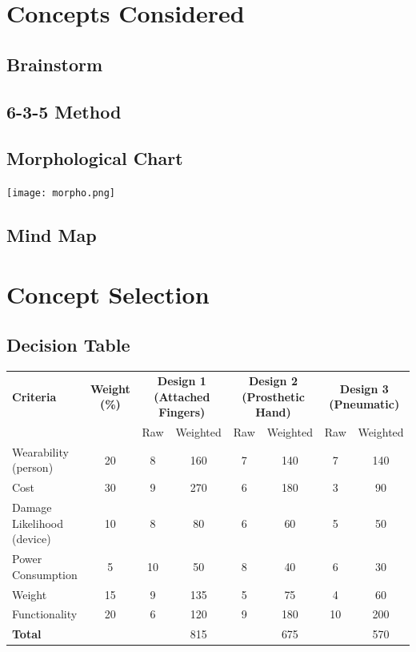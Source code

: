 \documentclass{article}
\begin{document}
\section{Concepts Considered}
\subsection{Brainstorm}

\subsection{6-3-5 Method}

\subsection{Morphological Chart}
\texttt{[image: morpho.png]}
\subsection{Mind Map}


\section{Concept Selection}

\subsection{Decision Table}
\begin{table}[h]
    \noindent\hspace{-4.5cm}
    \small
    \begin{tabular}{l c | c c | c c | c c}
        \toprule
        \textbf{Criteria} & \textbf{Weight (\%)} & \multicolumn{2}{c|}{\textbf{Design 1 (Attached Fingers)}} & \multicolumn{2}{c|}{\textbf{Design 2 (Prosthetic Hand)}} & \multicolumn{2}{c}{\textbf{Design 3 (Pneumatic)}} \\
        \cmidrule(lr){3-4} \cmidrule(lr){5-6} \cmidrule(lr){7-8}
        & & Raw & Weighted & Raw & Weighted & Raw & Weighted \\
        \midrule
        Wearability (person) & 20 & 8 & 160 & 7 & 140 & 7 & 140 \\
        Cost & 30 & 9 & 270 & 6 & 180 & 3 & 90 \\
        Damage Likelihood (device) & 10 & 8 & 80 & 6 & 60 & 5 & 50 \\
        Power Consumption & 5 & 10 & 50 & 8 & 40 & 6 & 30 \\
        Weight & 15 & 9 & 135 & 5 & 75 & 4 & 60 \\
        Functionality & 20 & 6 & 120 & 9 & 180 & 10 & 200 \\
        \midrule
        \textbf{Total} & & & 815 & & 675 & & 570 \\
        \bottomrule
    \end{tabular}
\end{table}
\end{document}

